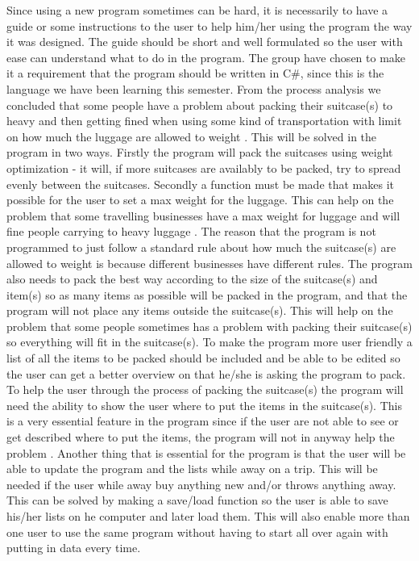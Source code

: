 Since using a new program sometimes can be hard, it is necessarily to have a guide or some instructions to the user to help him/her using the program the way it was designed. The guide should be short and well formulated so the user with ease can understand what to do in the program.
The group have chosen to make it a requirement that the program should be written in C\#, since this is the language we have been learning this semester.
From the process analysis  we concluded that some people have a problem about packing their suitcase(s) to heavy and then getting fined when using some kind of transportation with limit on how much the luggage are allowed to weight . 
This will be solved in the program in two ways. 
Firstly the program will pack the suitcases using weight optimization - it will, if more suitcases are availably to be packed, try to spread evenly between the suitcases. 
Secondly a function must be made that makes it possible for the user to set a max weight for the luggage. This can help on the problem that some travelling businesses have a max weight for luggage and will fine people carrying to heavy luggage . The reason that the program is not programmed to just follow a standard rule about how much the suitcase(s) are allowed to weight is because different businesses have different rules.
The program also needs to pack the best way according to the size of the suitcase(s) and item(s) so as many items as possible will be packed in the program, and that the program will not place any items outside the suitcase(s). This will help on the problem that some people sometimes has a problem with packing their suitcase(s) so everything will fit in the suitcase(s).
To make the program more user friendly a list of all the items to be packed should be included and be able to be edited so the user can get a better overview on that he/she is asking the program to pack.
To help the user through the process of packing the suitcase(s) the program will need the ability to show the user where to put the items in the suitcase(s). This is a very essential feature in the program since if the user are not able to see or get described where to put the items, the program will not in anyway help the problem .
Another thing that is essential for the program is that the user will be able to update the program and the lists while away on a trip. This will be needed if the user while away buy anything new and/or throws anything away. This can be solved by making a save/load function so the user is able to save his/her lists on he computer and later load them. This will also enable more than one user to use the same program without having to start all over again with putting in data every time.  

